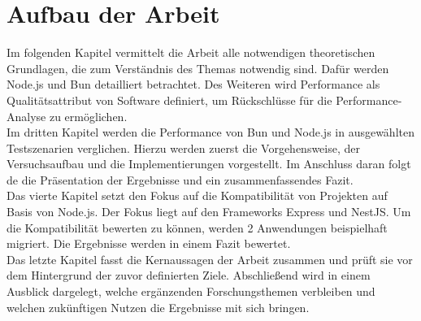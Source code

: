 \section{Aufbau der Arbeit} \label{sec:introduction-overview}
Im folgenden Kapitel vermittelt die Arbeit alle notwendigen theoretischen Grundlagen, die zum Verständnis des Themas notwendig sind. Dafür werden Node.js und Bun detailliert betrachtet. Des Weiteren wird Performance als Qualitätsattribut von Software definiert, um Rückschlüsse für die Performance-Analyse zu ermöglichen.\\

\noindent
Im dritten Kapitel werden die Performance von Bun und Node.js in ausgewählten Testszenarien verglichen. Hierzu werden zuerst die Vorgehensweise, der Versuchsaufbau und die Implementierungen vorgestellt. Im Anschluss daran folgt de die Präsentation der Ergebnisse und ein zusammenfassendes Fazit.\\

\noindent
Das vierte Kapitel setzt den Fokus auf die Kompatibilität von Projekten auf Basis von Node.js. Der Fokus liegt auf den Frameworks Express und NestJS. Um die Kompatibilität bewerten zu können, werden 2 Anwendungen beispielhaft migriert. Die Ergebnisse werden in einem Fazit bewertet.\\

\noindent
Das letzte Kapitel fasst die Kernaussagen der Arbeit zusammen und prüft sie vor dem Hintergrund der zuvor definierten Ziele. Abschließend wird in einem Ausblick dargelegt, welche ergänzenden Forschungsthemen verbleiben und welchen zukünftigen Nutzen die Ergebnisse mit sich bringen.


